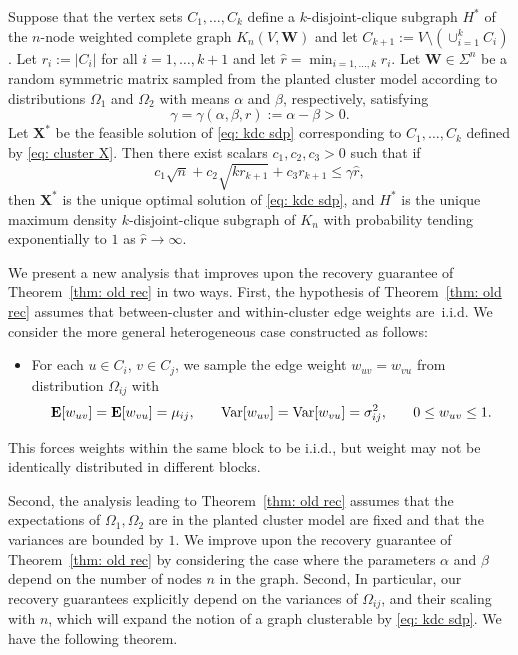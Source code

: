 \documentclass[twoside,11pt]{article}
\newcommand{\E}{\mathbf{E}}
\newcommand{\bs}{\boldsymbol}
\newcommand{\X}{\bs {X}}
\newcommand{\W}{\bs {W}}
\newcommand{\0}{\bs{0}}
\newcommand{\rbra}[1]{\ensuremath{\left( #1 \right)}} %
\newcommand{\ra}{\rightarrow}
\newcommand{\kdc}{\(k\)-disjoint-clique }
\begin{document}
{\begin{theorem}
	\label{thm: old rec}
	Suppose that the vertex sets \(C_1, \dots, C_k\) define a \kdc subgraph \(H^*\) of the
	\(n\)-node weighted complete graph \(K_n(V, \W)\) and let \(C_{k+1} := V \setminus \rbra{ \cup^k_{i=1} C_i } \).
	Let \(r_i := |C_i|\) for all \(i=1,\dots, k+1\)
	and let \( \hat r = \min_{i=1,\dots,k} r_i.\)
	Let \( \W \in \Sigma^n\) be a random symmetric matrix sampled from the planted cluster model
	according to distributions \(\Omega_1\) and \(\Omega_2\) with means \(\alpha\) and \( \beta\), respectively,	satisfying
	\[
	\gamma = \gamma(\alpha, \beta, r):=
	\alpha - \beta > 0.
	\]
	Let \(\X^*\) be the feasible solution of \eqref{eq: kdc sdp} corresponding to \(C_1,\dots, C_k\)
	defined by \eqref{eq: cluster X}.
	Then there exist scalars \(c_1, c_2, c_3 > 0\) such that if
	\begin{equation} \label{eq: old rec}
	c_1 \sqrt{n} + c_2 \sqrt{k r_{k+1}} + c_3 r_{k+1} \le \gamma \hat r,
	\end{equation}
	then \( \X^* \) is the unique optimal solution of \eqref{eq: kdc sdp},
	and \( H^*\) is the unique maximum density \kdc subgraph of \(K_n\)
	with probability tending exponentially to \(1\) as \(\hat r \ra \infty\).
\end{theorem}
%
We present a new analysis that improves upon the recovery guarantee of Theorem~\ref{thm: old rec} in two ways.
First, the hypothesis of Theorem~\ref{thm: old rec} assumes that between-cluster and within-cluster edge weights are~i.i.d. We consider the more general heterogeneous case constructed as follows:
\begin{itemize}
	\item For each $u \in C_i$, $v \in C_j$, we sample the edge weight $w_{uv} = w_{vu}$ from distribution $\Omega_{ij}$ with
	\[
	\E[w_{uv}]  = \E[w_{vu}] = \mu_{ij}, \hspace{0.25in}
	\text{Var}[w_{uv}] = \text{Var}[w_{vu}] = \sigma^2_{ij},
	\hspace{0.25in}
	0 \le w_{uv} \le 1.
	\]
\end{itemize}
This forces weights within the same block to be i.i.d., but weight may not be identically distributed in different blocks.

Second, the analysis leading to Theorem~\ref{thm: old rec} assumes that the expectations of \(\Omega_{1}, \Omega_2\) are
in the planted cluster model are fixed and that the variances are bounded by \(1\).
We improve upon the recovery guarantee of Theorem~\ref{thm: old rec} by considering the case
where the parameters \(\alpha\) and \(\beta\) depend on the number of nodes \(n\) in the graph.
Second,
In particular, our recovery guarantees explicitly depend on the
variances of \(\Omega_{ij}\), and their scaling with $n$, which will expand the notion of a graph
clusterable by \eqref{eq: kdc sdp}. We have the following theorem.

}
\end{document}
